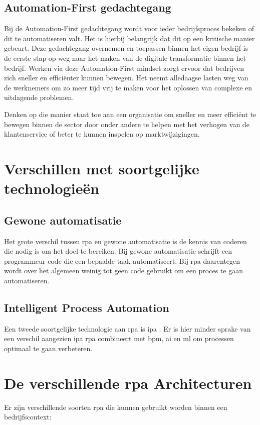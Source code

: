 \subsection{Automation-First gedachtegang}
Bij de Automation-First gedachtegang wordt voor ieder bedrijfsproces bekeken of dit te automatiseren valt. Het is hierbij belangrijk dat dit op een kritische manier gebeurt. Deze gedachtegang overnemen en toepassen binnen het eigen bedrijf is de eerste stap op weg naar het maken van de digitale transformatie binnen het bedrijf. Werken via deze Automation-First mindset zorgt ervoor dat bedrijven zich sneller en efficiënter kunnen bewegen. Het neemt alledaagse lasten weg van de werknemers om zo meer tijd vrij te maken voor het oplossen van complexe en uitdagende problemen.

Denken op die manier staat toe aan een organisatie om sneller en meer efficiënt te bewegen binnen de sector door onder andere te helpen met het verhogen van de klantenservice of beter te kunnen inspelen op marktwijzigingen.

\section{Verschillen met soortgelijke technologieën}

\subsection{Gewone automatisatie}
Het grote verschil tussen \acrshort{rpa} en gewone automatisatie is de kennis van coderen die nodig is om het doel te bereiken. Bij gewone automatisatie schrijft een programmeur code die een bepaalde taak automatiseert. Bij \acrshort{rpa} daarentegen wordt over het algemeen weinig tot geen code gebruikt om een proces te gaan automatiseren. \autocite{rpaVsScript}

\subsection{Intelligent Process Automation}
Een tweede soortgelijke technologie aan \acrshort{rpa} is \acrfull{ipa} . Er is hier minder sprake van een verschil aangezien \acrshort{ipa} \acrshort{rpa} combineert met \acrshort{bpm}, \acrshort{ai} en \acrfull{ml} om processen optimaal te gaan verbeteren.
\autocite{everythingRPA}

\section{De verschillende \acrshort{rpa} Architecturen}
Er zijn verschillende soorten \acrshort{rpa} die kunnen gebruikt worden binnen een bedrijfscontext:

